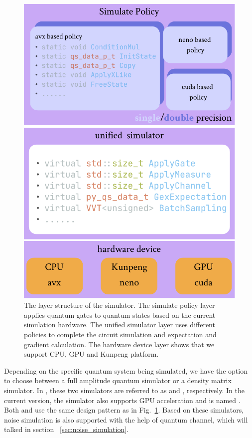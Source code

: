 \begin{figure}[ht]
    \centering
    \includegraphics[scale=0.6]{./images/4_1_simulator_structure.pdf}
    \captionsetup{justification=raggedright,singlelinecheck=false}
    \caption{\label{4_1_sim_str} The layer structure of the simulator. The simulate policy layer applies quantum gates to quantum states based on the current simulation hardware. The unified simulator layer uses different policies to complete the circuit simulation and expectation and gradient calculation. The hardware device layer shows that we support CPU, GPU and Kunpeng platform.}
\end{figure}

Depending on the specific quantum system being simulated, we have the option to choose between a full amplitude quantum simulator or a density matrix simulator. In \MindQuantum, these two simulators are referred to as  and , respectively. In the current \version version, the  simulator also supports GPU acceleration and is named . Both  and  use the same design pattern as in Fig.~\ref{4_1_sim_str}. Based on these simulators, noise simulation is also supported with the help of quantum channel, which will talked in section ~\ref{sec:noise_simulation}.

